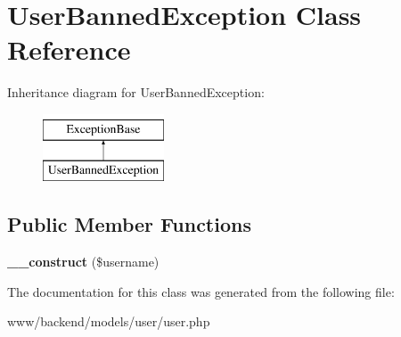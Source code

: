 \hypertarget{classUserBannedException}{
\section{UserBannedException Class Reference}
\label{classUserBannedException}
}
Inheritance diagram for UserBannedException:\begin{figure}[H]
\begin{center}
\leavevmode
\includegraphics[height=2.000000cm]{classUserBannedException}
\end{center}
\end{figure}
\subsection*{Public Member Functions}
\begin{DoxyCompactItemize}
\item 
\hypertarget{classUserBannedException_aa7ca1aed5a0ee2530bda51acbfd553df}{
{\bfseries \_\-\_\-construct} (\$username)}
\label{classUserBannedException_aa7ca1aed5a0ee2530bda51acbfd553df}

\end{DoxyCompactItemize}


The documentation for this class was generated from the following file:\begin{DoxyCompactItemize}
\item 
www/backend/models/user/user.php\end{DoxyCompactItemize}
